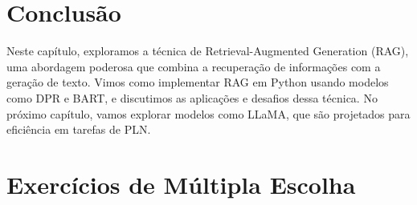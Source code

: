 \documentclass[14pt,a4paper,oneside]{book}
\begin{document}
\section{Conclusão}

Neste capítulo, exploramos a técnica de Retrieval-Augmented Generation (RAG), uma abordagem poderosa que combina a recuperação de informações com a geração de texto. Vimos como implementar RAG em Python usando modelos como DPR e BART, e discutimos as aplicações e desafios dessa técnica. No próximo capítulo, vamos explorar modelos como LLaMA, que são projetados para eficiência em tarefas de PLN.

\section*{Exercícios de Múltipla Escolha}
\end{document}

